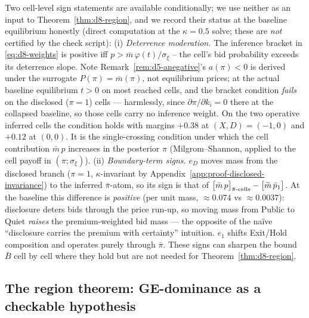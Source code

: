 \begin{remark}
\label{rem:d8-signs}
Two cell-level sign statements are available conditionally; we use neither as an input to Theorem~\ref{thm:d8-region}, and we record their status at the baseline equilibrium honestly (direct computation at the $\kappa=0.5$ solve; these are \emph{not} certified by the check script):
(i) \emph{Deterrence moderation.} The inference bracket in \eqref{eq:d8-weights} is positive iff $p>\bar m\,\varphi(t)/\sigma_\xi$ -- the cell's bid probability exceeds its deterrence slope. Note Remark~\ref{rem:d5-anegative}'s $a(\pi)<0$ is derived under the surrogate $P(\pi)=\bar m(\pi)$, not equilibrium prices; at the actual baseline equilibrium $t>0$ on most reached cells, and the bracket condition \emph{fails} on the disclosed ($\pi=1$) cells --- harmlessly, since $\partial\pi/\partial k_i=0$ there at the collapsed baseline, so those cells carry no inference weight. On the two operative inferred cells the condition holds with margins $+0.38$ at $(X,D)=(-1,0)$ and $+0.12$ at $(0,0)$. It is the single-crossing condition under which the cell contribution $\bar m\,p$ increases in the posterior $\pi$ (Milgrom--Shannon, applied to the cell payoff in $(\pi;\sigma_\xi)$).
(ii) \emph{Boundary-term signs.} $e_D$ moves mass from the disclosed branch ($\pi=1$, $\kappa$-invariant by Appendix~\ref{app:proof-disclosed-invariance}) to the inferred $\bar\pi$-atom, so its sign is that of $\big[\bar m\,p\big]_{\bar\pi\text{-cells}}-\big[\widetilde{m}\,\bar p_1\big]$. At the baseline this difference is \emph{positive} (per unit mass, $\approx0.074$ vs $\approx0.0037$): disclosure deters bids through the price run-up, so moving mass from Public to Quiet \emph{raises} the premium-weighted bid mass --- the opposite of the na\"ive ``disclosure carries the premium with certainty'' intuition. $e_1$ shifts Exit/Hold composition and operates purely through $\bar\pi$.
These signs can sharpen the bound $\bar B$ cell by cell where they hold but are not needed for Theorem~\ref{thm:d8-region}.
\end{remark}

\subsection{The region theorem: GE-dominance as a checkable hypothesis}

